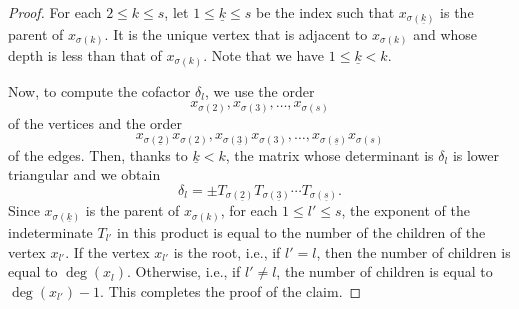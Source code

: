 \documentclass[11pt]{article}
\theoremstyle{definition}
\numberwithin{equation}{section}
\newcommand{\ul}[1]{\underline{#1}}
\begin{document}
\begin{proof}
For each $2 \leq k \leq s$, let $1 \leq \ul{k} \leq s$ be the index such that $x_{\sigma(\ul{k})}$ is the parent of $x_{\sigma(k)}$.
It is the unique vertex that is adjacent to $x_{\sigma(k)}$ and whose depth is less than that of $x_{\sigma(k)}$.
Note that we have $1 \leq \ul{k} < k$.

Now, to compute the cofactor $\delta_l$, we use the order
\[
x_{\sigma(2)}, x_{\sigma(3)}, \dots, x_{\sigma(s)}
\]
of the vertices and the order
\[
x_{\sigma(\ul{2})} x_{\sigma(2)}, x_{\sigma(\ul{3})} x_{\sigma(3)}, \dots, x_{\sigma(\ul{s})} x_{\sigma(s)}
\]
of the edges.
Then, thanks to $\ul{k} < k$, the matrix whose determinant is $\delta_l$ is lower triangular and we obtain
\[
\delta_l = \pm T_{\sigma(\ul{2})} T_{\sigma(\ul{3})} \cdots T_{\sigma(\ul{s})}.
\]
Since $x_{\sigma(\ul{k})}$ is the parent of $x_{\sigma(k)}$, for each $1 \leq l' \leq s$, the exponent of the indeterminate $T_{l'}$ in this product is equal to the number of the children of the vertex $x_{l'}$.
If the vertex $x_{l'}$ is the root, i.e., if $l' = l$, then the number of children is equal to $\deg(x_l)$.
Otherwise, i.e., if $l' \neq l$, the number of children is equal to $\deg(x_{l'}) - 1$.
This completes the proof of the claim.
\end{proof}
\end{document}
